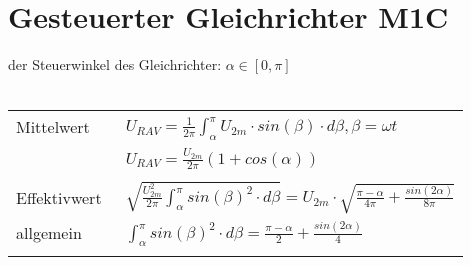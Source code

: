 \section{Gesteuerter Gleichrichter M1C}
der Steuerwinkel des Gleichrichter: $\alpha \in [0, \pi]$\\\\
\begin{tabular}{ll}
  Mittelwert &\ $U_{R AV} = \frac{1}{2\pi}\int_{\alpha}^{\pi}U_{2m} \cdot sin(\beta) \cdot d\beta, \beta = \omega t$\\
  &\ $U_{R AV} = \frac{U_{2m}}{2\pi}(1 + cos(\alpha))$\\\\
  Effektivwert &\ $\sqrt{\frac{U_{2m}^2}{2\pi}\int_{\alpha}^{\pi}sin(\beta)^2 \cdot d\beta} = U_{2m} \cdot \sqrt{\frac{\pi-\alpha}{4\pi}+\frac{sin(2\alpha)}{8\pi}}$\\
  allgemein &\ $\int_{\alpha}^{\pi}sin(\beta)^2 \cdot d\beta = \frac{\pi-\alpha}{2}+\frac{sin(2\alpha)}{4}$\\\\
\end{tabular}